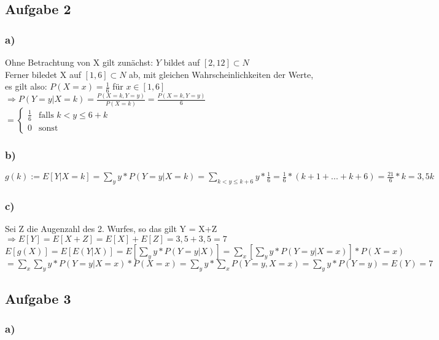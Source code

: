 \documentclass[11pt]{amsart}
\begin{document}
\subsection{Aufgabe 2}

\subsubsection{a)}
Ohne Betrachtung von X gilt zunächst: $Y$ bildet auf $[2,12] \subset N$ \\
Ferner biledet X auf $[1,6] \subset N$ ab, mit gleichen Wahrscheinlichkeiten der Werte, es gilt also: $P(X=x) = \frac{1}{6}$ für $x \in [1,6]$ \\
$\Rightarrow P(Y = y | X = k) = \frac{P(X=k , Y = y)}{P(X = k)} = \frac{P(X=k , Y = y)}{6}$ \\
$ = \begin{cases} \frac{1}{6} &\mbox{falls } k < y \leq 6+k \\ 0 &\mbox{sonst} \end{cases}$ \\

\subsubsection{b)}
$g(k) := E[Y|X=k] = \sum_yy*P(Y=y | X = k) = \sum_{k < y \leq k+6}y*\frac{1}{6} = \frac{1}{6} * (k+1 + ... + k+6) = \frac{21}{6}*k = 3,5k$

\subsubsection{c)}
Sei Z die Augenzahl des 2. Wurfes, so das gilt Y = X+Z \\
$\Rightarrow E[Y] = E[X+Z] = E[X]+E[Z] = 3,5 + 3,5 = 7$ \\
$E[g(X)] = E[E(Y|X)] = E[\sum_yy*P(Y=y | X )] = \sum_x[\sum_yy*P(Y=y|X=x)]*P(X=x)$ \\
$= \sum_x\sum_yy*P(Y=y|X=x)*P(X=x) = \sum_yy*\sum_xP(Y=y, X=x) = \sum_yy*P(Y=y) = E(Y) = 7$ \\

\subsection{Aufgabe 3}

\subsubsection{a)}
\end{document}
